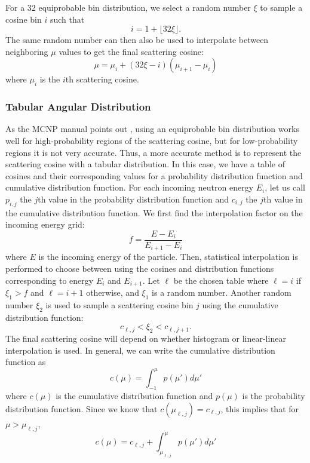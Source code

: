 For a 32 equiprobable bin distribution, we select a random number $\xi$ to
sample a cosine bin $i$ such that
\begin{equation}
  \label{eq:equiprobable-bin}
  i = 1 + \lfloor 32\xi \rfloor.
\end{equation}
The same random number can then also be used to interpolate between neighboring
$\mu$ values to get the final scattering cosine:
\begin{equation}
  \label{eq:equiprobable-cosine}
  \mu = \mu_i + (32\xi - i) (\mu_{i+1} - \mu_i)
\end{equation}
where $\mu_i$ is the $i$th scattering cosine.

\subsubsection{Tabular Angular Distribution}
\label{sec:angle-tabular}

As the MCNP manual points out \cite{lanl-x5-2008}, using an equiprobable bin
distribution works well for high-probability regions of the scattering cosine,
but for low-probability regions it is not very accurate. Thus, a more accurate
method is to represent the scattering cosine with a tabular distribution. In
this case, we have a table of cosines and their corresponding values for a
probability distribution function and cumulative distribution function. For each
incoming neutron energy $E_i$, let us call $p_{i,j}$ the $j$th value in the
probability distribution function and $c_{i,j}$ the $j$th value in the
cumulative distribution function. We first find the interpolation factor on the
incoming energy grid:
\begin{equation}
  \label{eq:interpolation-factor}
  f = \frac{E - E_i}{E_{i+1} - E_i}
\end{equation}
where $E$ is the incoming energy of the particle. Then, statistical
interpolation is performed to choose between using the cosines and distribution
functions corresponding to energy $E_i$ and $E_{i+1}$. Let $\ell$ be the chosen
table where $\ell = i$ if $\xi_1 > f$ and $\ell = i + 1$ otherwise, and $\xi_1$
is a random number. Another random number $\xi_2$ is used to sample a scattering
cosine bin $j$ using the cumulative distribution function:
\begin{equation}
  \label{eq:sample-cdf}
  c_{\ell,j} < \xi_2 < c_{\ell,j+1}.
\end{equation}
The final scattering cosine will depend on whether histogram or linear-linear
interpolation is used. In general, we can write the cumulative distribution
function as
\begin{equation}
  \label{eq:cdf}
  c(\mu) = \int_{-1}^\mu p(\mu') d\mu'
\end{equation}
where $c(\mu)$ is the cumulative distribution function and $p(\mu)$
is the probability distribution function. Since we know that
$c(\mu_{\ell,j}) = c_{\ell,j}$, this implies that for $\mu >
\mu_{\ell,j}$,
\begin{equation}
  \label{eq:cdf-2}
  c(\mu) = c_{\ell,j} + \int_{\mu_{\ell,j}}^{\mu} p(\mu') d\mu'
\end{equation}

